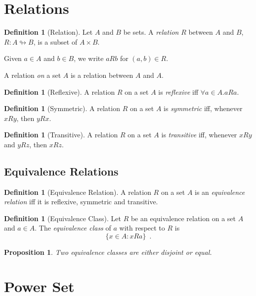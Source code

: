 \documentclass{book}
\newtheorem{prop}[ax]{Proposition}
\theoremstyle{definition}
\newtheorem{df}[ax]{Definition}
\begin{document}
\section{Relations} %

\begin{df}[Relation]
Let $A$ and $B$ be sets. A \emph{relation} $R$ between $A$ and $B$, $R : A \looparrowright B$, is a subset of $A \times B$.

Given $a \in A$ and $b \in B$, we write $aRb$ for $(a,b) \in R$.

A relation \emph{on} a set $A$ is a relation between $A$ and $A$.
\end{df}

\begin{df}[Reflexive]
A relation $R$ on a set $A$ is \emph{reflexive} iff $\forall a \in A. aRa$.
\end{df}

\begin{df}[Symmetric]
A relation $R$ on a set $A$ is \emph{symmetric} iff, whenever $xRy$, then $yRx$.
\end{df}

\begin{df}[Transitive]
A relation $R$ on a set $A$ is \emph{transitive} iff, whenever $xRy$ and $yRz$, then $xRz$.
\end{df}

\subsection{Equivalence Relations}

\begin{df}[Equivalence Relation]
A relation $R$ on a set $A$ is an \emph{equivalence relation} iff it is reflexive, symmetric and transitive.
\end{df}

\begin{df}[Equivalence Class]
Let $R$ be an equivalence relation on a set $A$ and $a \in A$. The \emph{equivalence class} of $a$ with respect to $R$ is
\[ \{ x \in A : xRa \} \enspace . \]
\end{df}

\begin{prop}
Two equivalence classes are either disjoint or equal.
\end{prop}


\section{Power Set}
\end{document}
